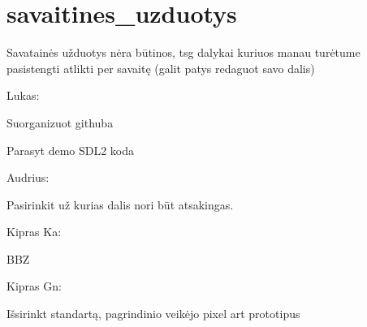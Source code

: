 \chapter{savaitines\+\_\+uzduotys}
\hypertarget{md_savaitines__uzduotys}{}\label{md_savaitines__uzduotys}
Savatainės užduotys nėra būtinos, tsg dalykai kuriuos manau turėtume pasistengti atlikti per savaitę (galit patys redaguot savo dalis)

Lukas\+:
\begin{DoxyItemize}
\item Suorganizuot githuba
\item Parasyt demo SDL2 koda
\end{DoxyItemize}

Audrius\+:
\begin{DoxyItemize}
\item Pasirinkit už kurias dalis nori būt atsakingas.
\end{DoxyItemize}

Kipras Ka\+:
\begin{DoxyItemize}
\item BBZ
\end{DoxyItemize}

Kipras Gn\+:
\begin{DoxyItemize}
\item Išsirinkt standartą, pagrindinio veikėjo pixel art prototipus 
\end{DoxyItemize}